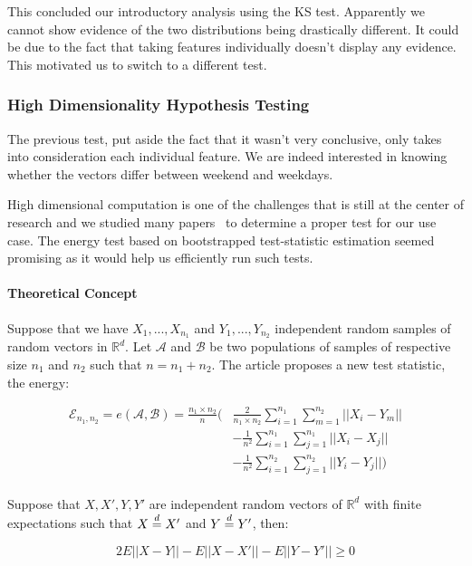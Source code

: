 This concluded our introductory analysis using the KS test. Apparently we cannot show evidence of the two distributions being drastically different. It could be due to the fact that taking features individually doesn't display any evidence. This motivated us to switch to a different test. 

\subsubsection{High Dimensionality Hypothesis Testing}
The previous test, put aside the fact that it wasn't very conclusive, only takes into consideration each individual feature. We are indeed interested in knowing whether the vectors differ between weekend and weekdays.

High dimensional computation is one of the challenges that is still at the center of research and we studied many papers~\cite{min_energy,two_sample_equality,dimensional_object,energy_test} to determine a proper test for our use case. The energy test based on bootstrapped test-statistic estimation seemed promising as it would help us efficiently run such tests.

\paragraph{Theoretical Concept}  
Suppose that we have $X_{1},...,X_{n_1}$ and $Y_{1},...,Y_{n_2}$ independent random samples of random vectors in $\mathbb{R}^d$. Let $\mathcal{A}$ and $\mathcal{B}$ be two populations of samples of respective size $n_1$ and $n_2$ such that $n=n_1+n_2$. The article proposes a new test statistic, the energy:

\begin{align}
	\mathcal{E}_{n_1,n_2} = e(\mathcal{A},\mathcal{B}) = \frac{n_1 \times n_2}{n} ( & \frac{2}{n_1\times n_2} \sum_{i=1}^{n_1}\sum_{m=1}^{n_2}||X_i-Y_m||\\ 
	&- \frac{1}{n^2}\sum_{i=1}^{n_1}\sum_{j=1}^{n_1}||X_i-X_j||\\ 
	&- \frac{1}{n^2}\sum_{i=1}^{n_2}\sum_{j=1}^{n_2}||Y_i-Y_j||)\\
\end{align}

Suppose that $X,X',Y,Y'$ are independent random vectors of $\mathbb{R}^d$ with finite expectations such that $X \buildrel d \over = X'$ and $Y \buildrel d \over = Y'$, then:

\begin{equation}
	2 E||X-Y||- E||X-X'||- E||Y-Y'|| \ge 0
\end{equation}

